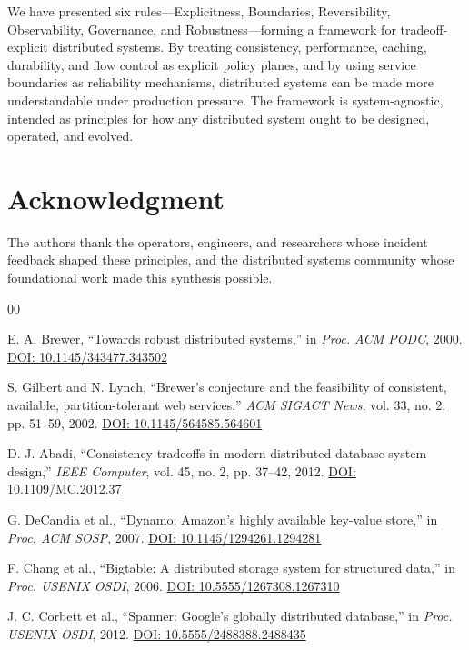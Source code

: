 \documentclass[conference]{IEEEtran}
\begin{document}
{We have presented six rules---Explicitness, Boundaries, Reversibility, Observability, Governance, and Robustness---forming a framework for tradeoff-explicit distributed systems. By treating consistency, performance, caching, durability, and flow control as explicit policy planes, and by using service boundaries as reliability mechanisms, distributed systems can be made more understandable under production pressure. The framework is system-agnostic, intended as principles for how any distributed system ought to be designed, operated, and evolved.

\section*{Acknowledgment}

The authors thank the operators, engineers, and researchers whose incident feedback shaped these principles, and the distributed systems community whose foundational work made this synthesis possible.

\begin{thebibliography}{00}

E. A. Brewer, ``Towards robust distributed systems,'' in \textit{Proc. ACM PODC}, 2000.
\href{https://doi.org/10.1145/343477.343502}{DOI: 10.1145/343477.343502}

S. Gilbert and N. Lynch, ``Brewer's conjecture and the feasibility of consistent, available, partition-tolerant web services,'' \textit{ACM SIGACT News}, vol. 33, no. 2, pp. 51--59, 2002.
\href{https://doi.org/10.1145/564585.564601}{DOI: 10.1145/564585.564601}

D. J. Abadi, ``Consistency tradeoffs in modern distributed database system design,'' \textit{IEEE Computer}, vol. 45, no. 2, pp. 37--42, 2012.
\href{https://doi.org/10.1109/MC.2012.37}{DOI: 10.1109/MC.2012.37}

G. DeCandia et al., ``Dynamo: Amazon's highly available key-value store,'' in \textit{Proc. ACM SOSP}, 2007.
\href{https://doi.org/10.1145/1294261.1294281}{DOI: 10.1145/1294261.1294281}

F. Chang et al., ``Bigtable: A distributed storage system for structured data,'' in \textit{Proc. USENIX OSDI}, 2006.
\href{https://doi.org/10.5555/1267308.1267310}{DOI: 10.5555/1267308.1267310}

J. C. Corbett et al., ``Spanner: Google's globally distributed database,'' in \textit{Proc. USENIX OSDI}, 2012.
\href{https://doi.org/10.5555/2488388.2488435}{DOI: 10.5555/2488388.2488435}


\end{thebibliography}}
\end{document}
